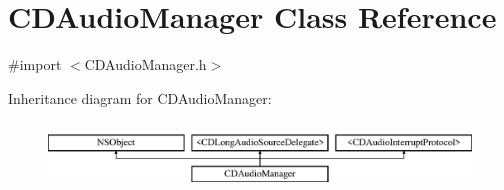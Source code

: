 \hypertarget{interface_c_d_audio_manager}{\section{C\-D\-Audio\-Manager Class Reference}
\label{interface_c_d_audio_manager}
}


{\ttfamily \#import $<$C\-D\-Audio\-Manager.\-h$>$}

Inheritance diagram for C\-D\-Audio\-Manager\-:\begin{figure}[H]
\begin{center}
\leavevmode
\includegraphics[height=1.830065cm]{interface_c_d_audio_manager}
\end{center}
\end{figure}
